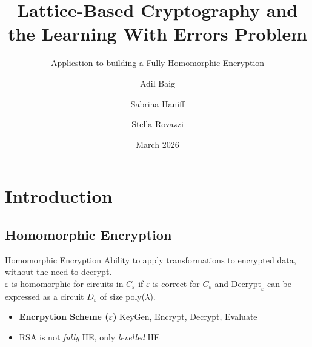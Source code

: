 \documentclass{beamer}
\author{Adil Baig \and Sabrina Haniff \and Stella Rovazzi}
\title{Lattice-Based Cryptography and the Learning With
Errors Problem }
\subtitle{Applicstion to building a Fully Homomorphic Encryption}
\institute{University of Guelph}
\date{March 2026}
\begin{document}
\begin{frame}
    \titlepage
\end{frame}

{\AtBeginSection{}
\section{Introduction}}
\subsection{Homomorphic Encryption}

\begin{frame}{Homomorphic Encryption} %
	Ability to apply transformations to encrypted data, without the need to decrypt. \\ 
	\vspace{0.5cm}
	$\varepsilon$ is homomorphic for circuits in $C_{\varepsilon}$ if $\varepsilon$ is correct for $C_{\varepsilon}$ and
	$\text{Decrypt}_{\varepsilon}$ can be expressed as a circuit $D_{\varepsilon}$ of size poly($\lambda$). \\
	\vspace{0.5cm}
	
	\begin{itemize}
	\item \textbf{Encrpytion Scheme ($\varepsilon$)} KeyGen, Encrypt, Decrypt, Evaluate %
	\item RSA is not \textit{fully} HE, only \textit{levelled} HE
	\end{itemize} 

\end{frame}
\end{document}
